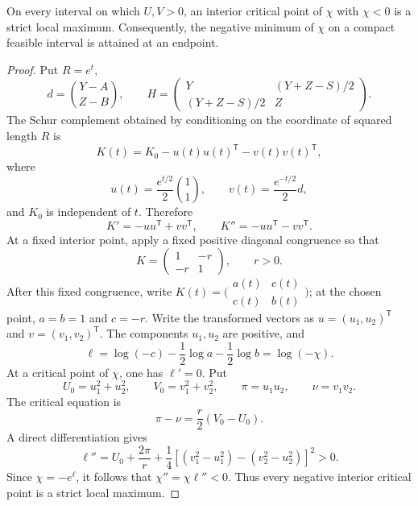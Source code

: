 \documentclass[10pt,a4paper]{amsart}
\begin{document}
\begin{theorem}\label{thm:endpoint-principle}
On every interval on which \(U,V>0\), an interior critical point of \(\chi\) with \(\chi<0\) is a strict local maximum. Consequently, the negative minimum of \(\chi\) on a compact feasible interval is attained at an endpoint.
\end{theorem}

\begin{proof}
Put \(R=e^t\),
\[
 d=\binom{Y-A}{Z-B},
 \qquad
 H=\begin{pmatrix}Y&(Y+Z-S)/2\\(Y+Z-S)/2&Z\end{pmatrix}.
\]
The Schur complement obtained by conditioning on the coordinate of squared length \(R\) is
\begin{equation}\label{eq:schur-pencil}
 K(t)=K_0-u(t)u(t)^{\mathsf T}-v(t)v(t)^{\mathsf T},
\end{equation}
where
\[
 u(t)=\frac{e^{t/2}}2\binom11,
 \qquad
 v(t)=\frac{e^{-t/2}}2d,
\]
and \(K_0\) is independent of \(t\). Therefore
\[
 K'=-uu^{\mathsf T}+vv^{\mathsf T},
 \qquad
 K''=-uu^{\mathsf T}-vv^{\mathsf T}.
\]
At a fixed interior point, apply a fixed positive diagonal congruence
so that
\[
 K=\begin{pmatrix}1&-r\\-r&1\end{pmatrix},
 \qquad r>0.
\]
After this fixed congruence, write
$K(t)=\bigl(\begin{smallmatrix}a(t)&c(t)\\c(t)&b(t)\end{smallmatrix}\bigr)$;
at the chosen point, $a=b=1$ and $c=-r$. Write the transformed vectors
as \(u=(u_1,u_2)^{\mathsf T}\) and \(v=(v_1,v_2)^{\mathsf T}\). The
components \(u_1,u_2\) are positive, and
\[
 \ell=\log(-c)-\frac12\log a-\frac12\log b=\log(-\chi).
\]
At a critical point of \(\chi\), one has \(\ell'=0\). Put
\[
 U_0=u_1^2+u_2^2,
 \qquad
 V_0=v_1^2+v_2^2,
 \qquad
 \pi=u_1u_2,
 \qquad
 \nu=v_1v_2.
\]
The critical equation is
\[
 \pi-\nu=\frac r2(V_0-U_0).
\]
A direct differentiation gives
\begin{equation}\label{eq:ell-second}
 \ell''
 =U_0+\frac{2\pi}{r}
 +\frac14\left[(v_1^2-u_1^2)-(v_2^2-u_2^2)\right]^2>0.
\end{equation}
Since \(\chi=-e^{\ell}\), it follows that \(\chi''=\chi\ell''<0\). Thus every negative interior critical point is a strict local maximum.
\end{proof}
\end{document}
